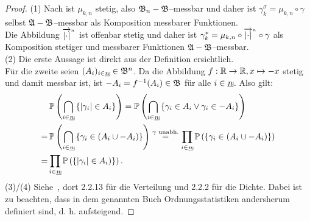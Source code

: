 \begin{proof}
(1) Nach
ist $\mu_{k,n}$ stetig, also $\mathfrak{B}_n-\mathfrak{B}$--messbar und daher ist
$\gamma^\sigma_k=\mu_{k,n} \circ\gamma$ selbst $\mathfrak{A}-\mathfrak{B}$--messbar als
Komposition messbarer Funktionen.\\
Die Abbildung ${\overrightarrow{\left|\cdot\right|}}^{{}_n}$ ist offenbar stetig und daher ist
$\gamma_k^\ast = \mu_{k,n} \circ{\overrightarrow{\left|\cdot\right|}}^{{}_n}\circ \gamma$ als
Komposition stetiger und messbarer Funktionen $\mathfrak{A}-\mathfrak{B}$--messbar.\\
(2) Die erste Aussage ist direkt aus der Definition ersichtlich.\\
Für die zweite seien $(A_i)_{i \in \haken n} \in \mfb^n$. Da die Abbildung
$f:\mathbb{R} \rightarrow \mathbb{R}, x \mapsto -x$ stetig und damit messbar ist, ist
$-A_i = f^{-1}(A_i) \in \mathfrak{B}$ für alle $i \in \haken n$. Also gilt:
\begin{align*}
&\,\Prim\left(\bigcap_{i \in \haken n} \meng{\abs{\gamma_i} \in A_i} \right)
= \Prim\left(\bigcap_{i \in \haken n} 
\meng{\gamma_i \in A_i \vee \gamma_i \in -A_i} \right)\\
=&\,\Prim\left(\bigcap_{i\in\haken n}\meng{\gamma_i\in(A_i \cup -A_i)} \right)
\overset{\gamma \text{ unabh.}}=
\prod_{i \in \haken n} \Prim\left(\meng{\gamma_i \in (A_i \cup -A_i )}\right)\\
=&\prod_{i \in \haken n} \Prim\left(\meng{\abs{\gamma_i} \in A_i)}\right)\text.
\end{align*}
(3)/(4) Siehe~\cite{AB}, dort 2.2.13 für die Verteilung und 2.2.2 für die
Dichte. Dabei ist zu beachten, dass in dem genannten Buch Ordnungsstatistiken
andersherum definiert sind, d. h. aufsteigend.
\end{proof}